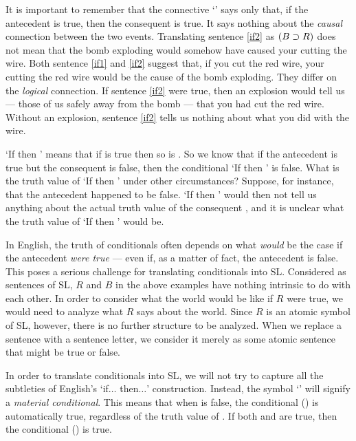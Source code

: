 It is important to remember that the connective `\eif' says only that, if the antecedent is true, then the consequent is true. It says nothing about the \emph{causal} connection between the two events. Translating sentence \ref{if2} as $(B \supset R)$ does not mean that the bomb exploding would somehow have caused your cutting the wire. Both sentence \ref{if1} and \ref{if2} suggest that, if you cut the red wire, your cutting the red wire would be the cause of the bomb exploding. They differ on the \emph{logical} connection. If sentence \ref{if2} were true, then an explosion would tell us --- those of us safely away from the bomb --- that you had cut the red wire. Without an explosion, sentence \ref{if2} tells us nothing about what you did with the wire.





`If \metaA{} then \metaB{}' means that if \metaA{} is true then so is \metaB{}. So we know that if the antecedent \metaA{} is true but the consequent \metaB{} is false, then the conditional `If \metaA{} then \metaB{}' is false. What is the truth value of `If \metaA{} then \metaB{}' under other circumstances? Suppose, for instance, that the antecedent \metaA{} happened to be false. `If \metaA{} then \metaB{}' would then not tell us anything about the actual truth value of the consequent \metaB{}, and it is unclear what the truth value of `If \metaA{} then \metaB{}' would be.

In English, the truth of conditionals often depends on what \emph{would} be the case if the antecedent \emph{were true} --- even if, as a matter of fact, the antecedent is false. This poses a serious challenge for translating conditionals into SL.  Considered as sentences of SL, $R$ and $B$ in the above examples have nothing intrinsic to do with each other. In order to consider what the world would be like if $R$ were true, we would need to analyze what $R$ says about the world. Since $R$ is an atomic symbol of SL, however, there is no further structure to be analyzed. When we replace a sentence with a sentence letter, we consider it merely as some atomic sentence that might be true or false.

In order to translate conditionals into SL, we will not try to capture all the subtleties of English's `if$\ldots$ then$\ldots$' construction. Instead, the symbol `\eif' will signify a \emph{material conditional}. This means that when \metaA{} is false, the conditional (\metaA{}\eif\metaB{}) is automatically true, regardless of the truth value of \metaB{}. If both \metaA{} and \metaB{} are true, then the conditional (\metaA{}\eif\metaB{}) is true.


